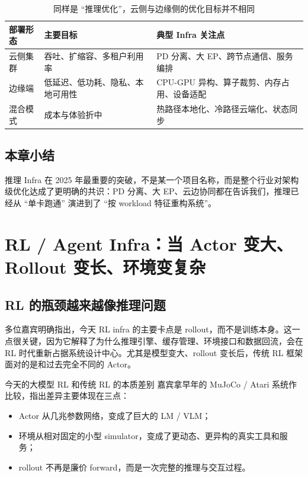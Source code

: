 \documentclass[a4paper]{article}
\begin{document}
\begin{table}[H]
\centering
\begin{tabular}{p{2.8cm}p{4.0cm}p{4.5cm}}
\toprule
\textbf{部署形态} & \textbf{主要目标} & \textbf{典型 Infra 关注点} \\
\midrule
云侧集群 & 吞吐、扩缩容、多租户利用率 & PD 分离、大 EP、跨节点通信、服务编排 \\
边缘端 & 低延迟、低功耗、隐私、本地可用性 & CPU-GPU 异构、算子裁剪、内存占用、设备适配 \\
混合模式 & 成本与体验折中 & 热路径本地化、冷路径云端化、状态同步 \\
\bottomrule
\end{tabular}
\caption{同样是 ``推理优化''，云侧与边缘侧的优化目标并不相同}
\end{table}

\subsection{本章小结}
推理 Infra 在 2025 年最重要的突破，不是某一个项目名称，而是整个行业对架构级优化达成了更明确的共识：PD 分离、大 EP、云边协同都在告诉我们，推理已经从 ``单卡跑通'' 演进到了 ``按 workload 特征重构系统''。

\section{RL / Agent Infra：当 Actor 变大、Rollout 变长、环境变复杂}

\subsection{RL 的瓶颈越来越像推理问题}
多位嘉宾明确指出，今天 RL infra 的主要卡点是 rollout，而不是训练本身。这一点很关键，因为它解释了为什么推理引擎、缓存管理、环境接口和数据回流，会在 RL 时代重新占据系统设计中心。尤其是模型变大、rollout 变长后，传统 RL 框架面对的是和过去完全不同的 Actor。

\begin{importantbox}{今天的大模型 RL 和传统 RL 的本质差别}
嘉宾拿早年的 MuJoCo / Atari 系统作比较，指出差异主要体现在三点：
\begin{itemize}
  \item Actor 从几兆参数网络，变成了巨大的 LM / VLM；
  \item 环境从相对固定的小型 simulator，变成了更动态、更异构的真实工具和服务；
  \item rollout 不再是廉价 forward，而是一次完整的推理与交互过程。
\end{itemize}
\end{importantbox}
\end{document}
